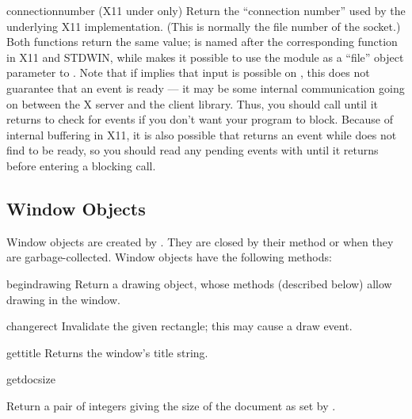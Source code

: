 \begin{funcdesc}{connectionnumber}{}
(X11 under \UNIX{} only) Return the ``connection number'' used by the
underlying X11 implementation.  (This is normally the file number of
the socket.)  Both functions return the same value;
 is named after the corresponding function in
X11 and STDWIN, while  makes it possible to use the
 module as a ``file'' object parameter to
.  Note that if  implies that
input is possible on , this does not guarantee that an
event is ready --- it may be some internal communication going on
between the X server and the client library.  Thus, you should call
 until it returns  to check for
events if you don't want your program to block.  Because of internal
buffering in X11, it is also possible that 
returns an event while  does not find  to
be ready, so you should read any pending events with
 until it returns  before entering
a blocking  call.
\end{funcdesc}

\subsection{Window Objects}

Window objects are created by .  They are closed
by their  method or when they are garbage-collected.
Window objects have the following methods:

\renewcommand{\indexsubitem}{(window method)}

\begin{funcdesc}{begindrawing}{}
Return a drawing object, whose methods (described below) allow drawing
in the window.
\end{funcdesc}

\begin{funcdesc}{change}{rect}
Invalidate the given rectangle; this may cause a draw event.
\end{funcdesc}

\begin{funcdesc}{gettitle}{}
Returns the window's title string.
\end{funcdesc}

\begin{funcdesc}{getdocsize}{}
\begin{sloppypar}
Return a pair of integers giving the size of the document as set by
.
\end{sloppypar}
\end{funcdesc}

